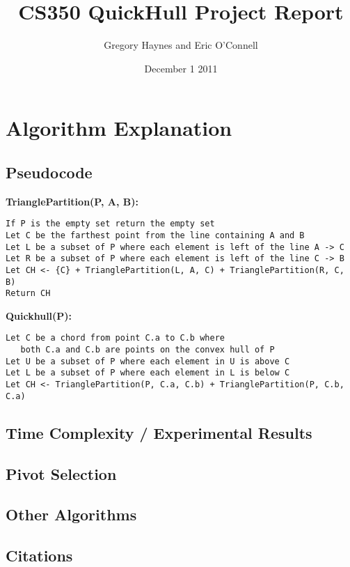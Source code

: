 \documentclass[11pt]{article}
\title{CS350 QuickHull Project Report}
\author{Gregory Haynes and Eric O'Connell}
\date{December 1 2011}
\begin{document}
\maketitle

\section{Algorithm Explanation}

\subsection{Pseudocode}

\textbf{TrianglePartition(P, A, B):}
\begin{verbatim}
If P is the empty set return the empty set
Let C be the farthest point from the line containing A and B
Let L be a subset of P where each element is left of the line A -> C
Let R be a subset of P where each element is left of the line C -> B
Let CH <- {C} + TrianglePartition(L, A, C) + TrianglePartition(R, C, B)
Return CH
\end{verbatim}
\textbf{Quickhull(P):}
\begin{verbatim}
Let C be a chord from point C.a to C.b where 
   both C.a and C.b are points on the convex hull of P
Let U be a subset of P where each element in U is above C
Let L be a subset of P where each element in L is below C
Let CH <- TrianglePartition(P, C.a, C.b) + TrianglePartition(P, C.b, C.a)
\end{verbatim}

\subsection{Time Complexity / Experimental Results}

\subsection{Pivot Selection}

\subsection{Other Algorithms}

\subsection{Citations}
\end{document}
